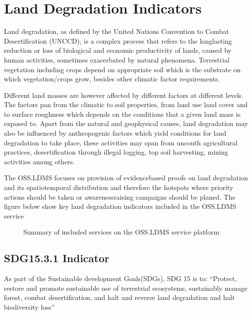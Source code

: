 \documentclass[letterpaper,10pt,english]{sphinxmanual}
\let\sphinxpxdimen\pdfpxdimen\else\newdimen\sphinxpxdimen
\begin{document}
\section{Land Degradation Indicators}
\label{\detokenize{Background/LD_indicators:land-degradation-indicators}}
\sphinxAtStartPar
Land degradation, as defined by the United Nations Convention to Combat Desertification (UNCCD), is a complex process that refers to the long\sphinxhyphen{}lasting reduction or loss of biological and economic productivity of lands, caused by human activities, sometimes exacerbated by natural phenomena. Terrestrial vegetation including crops depend on appropriate soil which is the substrate on which vegetation/crops grow, besides other climatic factor requirements.

\sphinxAtStartPar
Different land masses are however affected by different factors at different levels. The factors pan from the climatic to soil properties, from land use land cover and to surface roughness which depends on the conditions that a given land mass is exposed to. Apart from the natural and geophysical causes, land degradation may also be influenced by anthropogenic factors which yield conditions for land degradation to take place, these activities may span from uncouth agricultural practices, desertification through illegal logging, top soil harvesting, mining activities among others.

\sphinxAtStartPar
The OSS.LDMS focuses on provision of evidence\sphinxhyphen{}based proofs on land degradation and its spatiotemporal distribution and therefore the hotspots where priority actions should be taken or awareness\sphinxhyphen{}raising campaigns should be planed. The figure below show key land degradation indicators included in the OSS.LDMS service

\begin{figure}[H]
\centering
\capstart

\noindent\sphinxincludegraphics[width=351\sphinxpxdimen,height=341\sphinxpxdimen]{{service}.png}
\caption{Summary of included services on the OSS.LDMS service platform}\label{\detokenize{Background/LD_indicators:id1}}\end{figure}


\subsection{SDG15.3.1 Indicator}
\label{\detokenize{Background/LD_indicators:sdg15-3-1-indicator}}
\sphinxAtStartPar
As part of the Sustainable development Goals(SDGs), SDG 15 is to: “Protect, restore and promote sustainable use of terrestrial ecosystems, sustainably manage forest, combat desertification, and halt and reverse land degradation and halt biodiversity loss”
\end{document}
